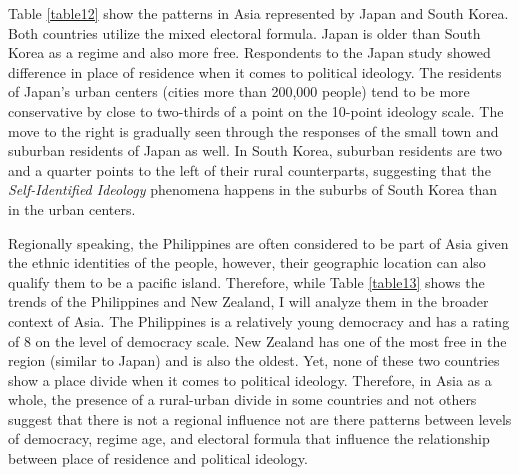 \documentclass[12pt, titlepage]{article}
\newcommand\e{\emph}
\begin{document}
Table \ref{table12} show the patterns in Asia represented by Japan and South Korea. Both countries utilize the mixed electoral formula. Japan is older than South Korea as a regime and also more free. Respondents to the Japan study showed difference in place of residence when it comes to political ideology. The residents of Japan's urban centers (cities more than 200,000 people) tend to be more conservative by close to two-thirds of a point on the 10-point ideology scale. The move to the right is gradually seen through the responses of the small town and suburban residents of Japan as well. In South Korea, suburban residents are two and a quarter points to the left of their rural counterparts, suggesting that the \e{Self-Identified Ideology} phenomena happens in the suburbs of South Korea than in the urban centers. 

Regionally speaking, the Philippines are often considered to be part of Asia given the ethnic identities of the people, however, their geographic location can also qualify them to be a pacific island. Therefore, while Table \ref{table13} shows the trends of the Philippines and New Zealand, I will analyze them in the broader context of Asia. The Philippines is a relatively young democracy and has a rating of 8 on the level of democracy scale. New Zealand has one of the most free in the region (similar to Japan) and is also the oldest. Yet, none of these two countries show a place divide when it comes to political ideology. Therefore, in Asia as a whole, the presence of a rural-urban divide in some countries and not others suggest that there is not a regional influence not are there patterns between levels of democracy, regime age, and electoral formula that influence the relationship between place of residence and political ideology.
\end{document}
